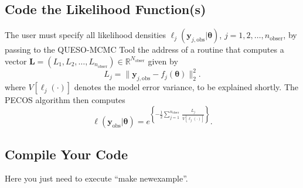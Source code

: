 \subsection{Code the Likelihood Function(s)}\label{subsc-gmc-eight-steps-likelihood-code}

The user must specify all likelihood densities $\ell_j(\mathbf{y}_{j,\text{obs}}|\boldsymbol{\theta})$, $j=1,2,\ldots,n_{\text{obser}}$,
by passing to the QUESO-MCMC Tool the address of a routine that computes a vector $\mathbf{L}=(L_1,L_2,\ldots,L_{n_{\text{obser}}})\in\mathbb{R}^{N_{\text{obser}}}$  given by
\begin{equation}\label{eq-m2l-likelihood}
L_j =
\|\mathbf{y}_{j,\text{obs}}-f_j(\boldsymbol{\theta})\|_2^2.
\end{equation}
where
$V[\ell_j(\cdot)]$ denotes the model error variance, to be explained shortly.
The PECOS algorithm then computes
\begin{equation*}
\ell(\mathbf{y}_{\text{obs}}|\boldsymbol{\theta}) = e^
{
\left\{
-\frac{1}{2}\sum_{j=1}^{n_{\text{obser}}}~\frac{L_j}{V[\ell_j(\cdot)]}
\right\}
}.
\end{equation*}


\subsection{Compile Your Code}\label{subsc-gmc-eight-steps-compile}

Here you just need to execute ``make newexample''.

